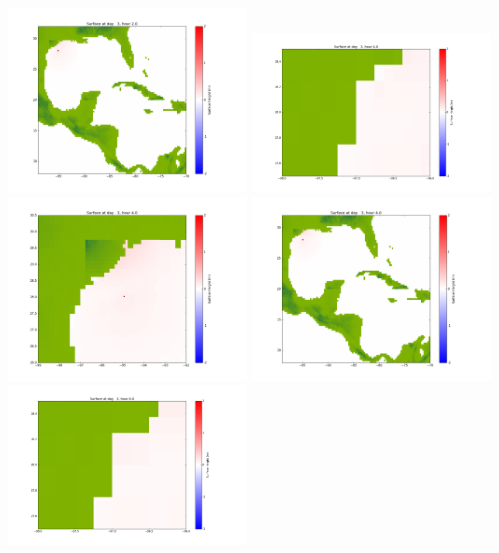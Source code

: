 \documentclass[11pt]{article}
\begin{document}
\vskip 10pt 
\includegraphics[width=0.475\textwidth]{frame0061fig1003.png}
\vskip 10pt 
\includegraphics[width=0.475\textwidth]{frame0062fig1001.png}
\includegraphics[width=0.475\textwidth]{frame0062fig1002.png}
\vskip 10pt 
\includegraphics[width=0.475\textwidth]{frame0062fig1003.png}
\vskip 10pt 
\includegraphics[width=0.475\textwidth]{frame0063fig1001.png}
\end{document}
